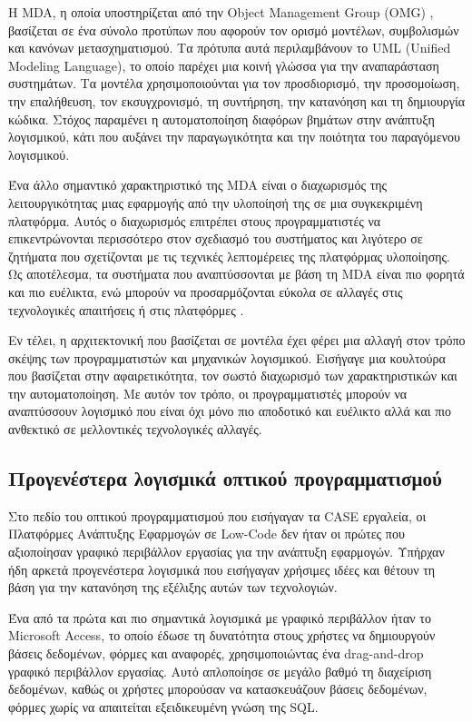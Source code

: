             Η MDA, η οποία υποστηρίζεται από την Object Management Group (OMG) \cite{OMG_MDA}, βασίζεται σε ένα σύνολο προτύπων που αφορούν τον ορισμό μοντέλων, συμβολισμών και κανόνων μετασχηματισμού. Τα πρότυπα αυτά περιλαμβάνουν το UML (Unified Modeling Language), το οποίο παρέχει μια κοινή γλώσσα για την αναπαράσταση συστημάτων. Τα μοντέλα χρησιμοποιούνται για τον προσδιορισμό, την προσομοίωση, την επαλήθευση, τον εκσυγχρονισμό, τη συντήρηση, την κατανόηση και τη δημιουργία κώδικα. Στόχος παραμένει η αυτοματοποίηση διαφόρων βημάτων στην ανάπτυξη λογισμικού, κάτι που αυξάνει την παραγωγικότητα και την ποιότητα του παραγόμενου λογισμικού.

            Ένα άλλο σημαντικό χαρακτηριστικό της MDA είναι ο διαχωρισμός της λειτουργικότητας μιας εφαρμογής από την υλοποίησή της σε μια συγκεκριμένη πλατφόρμα. Αυτός ο διαχωρισμός επιτρέπει στους προγραμματιστές να επικεντρώνονται περισσότερο στον σχεδιασμό του συστήματος και λιγότερο σε ζητήματα που σχετίζονται με τις τεχνικές λεπτομέρειες της πλατφόρμας υλοποίησης. Ως αποτέλεσμα, τα συστήματα που αναπτύσσονται με βάση τη MDA είναι πιο φορητά και πιο ευέλικτα, ενώ μπορούν να προσαρμόζονται εύκολα σε αλλαγές στις τεχνολογικές απαιτήσεις ή στις πλατφόρμες \cite{Bucaioni2022, MDELow, MDSDSpringer}.

            Εν τέλει, η αρχιτεκτονική που βασίζεται σε μοντέλα έχει φέρει μια αλλαγή στον τρόπο σκέψης των προγραμματιστών και μηχανικών λογισμικού. Εισήγαγε μια κουλτούρα που βασίζεται στην αφαιρετικότητα, τον σωστό διαχωρισμό των χαρακτηριστικών και την αυτοματοποίηση. Με αυτόν τον τρόπο, οι προγραμματιστές μπορούν να αναπτύσσουν λογισμικό που είναι όχι μόνο πιο αποδοτικό και ευέλικτο αλλά και πιο ανθεκτικό σε μελλοντικές τεχνολογικές αλλαγές.

        \subsection{Προγενέστερα λογισμικά οπτικού προγραμματισμού}
            Στο πεδίο του οπτικού προγραμματισμού που εισήγαγαν τα CASE εργαλεία, οι Πλατφόρμες Ανάπτυξης Εφαρμογών σε Low-Code δεν ήταν οι πρώτες που αξιοποίησαν γραφικό περιβάλλον εργασίας για την ανάπτυξη εφαρμογών. Υπήρχαν ήδη αρκετά προγενέστερα λογισμικά που εισήγαγαν χρήσιμες ιδέες και θέτουν τη βάση για την κατανόηση της εξέλιξης αυτών των τεχνολογιών.

            Ένα από τα πρώτα και πιο σημαντικά λογισμικά με γραφικό περιβάλλον ήταν το Microsoft Access, το οποίο έδωσε τη δυνατότητα στους χρήστες να δημιουργούν βάσεις δεδομένων, φόρμες και αναφορές, χρησιμοποιώντας ένα drag-and-drop γραφικό περιβάλλον εργασίας. Αυτό απλοποίησε σε μεγάλο βαθμό τη διαχείριση δεδομένων, καθώς οι χρήστες  μπορούσαν να κατασκευάζουν βάσεις δεδομένων, φόρμες χωρίς να απαιτείται εξειδικευμένη γνώση της SQL.

